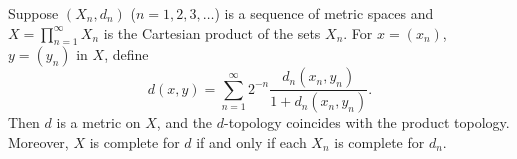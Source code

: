 Suppose $(X_n, d_n)$ ($n = 1, 2, 3, \ldots$) is a sequence of metric spaces and $X = \prod_{n=1}^{\infty} X_n$ is the Cartesian product of the sets $X_n$. For $x = (x_n)$, $y = (y_n)$ in $X$, define
$$d(x, y) = \sum_{n=1}^{\infty} 2^{-n} \frac{d_n(x_n, y_n)}{1 + d_n(x_n, y_n)}.$$
Then $d$ is a metric on $X$, and the $d$-topology coincides with the product topology. Moreover, $X$ is complete for $d$ if and only if each $X_n$ is complete for $d_n$.
